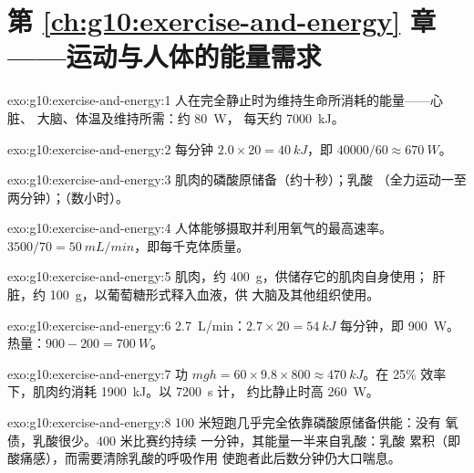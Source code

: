 \section*{第 \ref{ch:g10:exercise-and-energy} 章——运动与人体的能量需求}

\begin{solution}{exo:g10:exercise-and-energy:1}
人在完全静止时为维持生命所消耗的能量——心脏、
大脑、体温及维持所需：约 \qty{80}{W}，
每天约 \qty{7000}{kJ}。
\end{solution}

\begin{solution}{exo:g10:exercise-and-energy:2}
每分钟 $2.0 \times 20 = \qty{40}{kJ}$，即 $40000/60 \approx
\qty{670}{W}$。
\end{solution}

\begin{solution}{exo:g10:exercise-and-energy:3}
肌肉的磷酸原储备（约十秒）；乳酸
（全力运动一至两分钟）；（数小时）。
\end{solution}

\begin{solution}{exo:g10:exercise-and-energy:4}
人体能够摄取并利用氧气的最高速率。
$3500/70 = \qty{50}{mL/min}$，即每千克体质量。
\end{solution}

\begin{solution}{exo:g10:exercise-and-energy:5}
肌肉，约 \qty{400}{g}，供储存它的肌肉自身使用；
肝脏，约 \qty{100}{g}，以葡萄糖形式释入血液，供
大脑及其他组织使用。
\end{solution}

\begin{solution}{exo:g10:exercise-and-energy:6}
\qty{2.7}{L/min}：$2.7 \times 20 = \qty{54}{kJ}$ 每分钟，即
\qty{900}{W}。热量：$900 - 200 = \qty{700}{W}$。
\end{solution}

\begin{solution}{exo:g10:exercise-and-energy:7}
功 $mgh = 60 \times 9.8 \times 800 \approx \qty{470}{kJ}$。在 25\%
效率下，肌肉约消耗 \qty{1900}{kJ}。以 \qty{7200}{s} 计，
约比静止时高 \qty{260}{W}。
\end{solution}

\begin{solution}{exo:g10:exercise-and-energy:8}
100 米短跑几乎完全依靠磷酸原储备供能：没有
氧债，乳酸很少。400 米比赛约持续
一分钟，其能量一半来自乳酸：乳酸
累积（即酸痛感），而需要清除乳酸的呼吸作用
使跑者此后数分钟仍大口喘息。
\end{solution}

